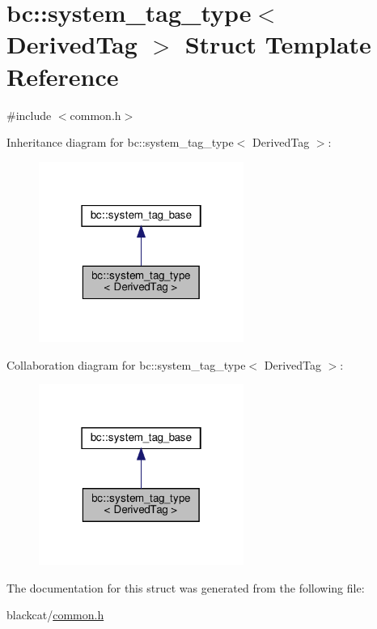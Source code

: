 \hypertarget{structbc_1_1system__tag__type}{}\section{bc\+:\+:system\+\_\+tag\+\_\+type$<$ Derived\+Tag $>$ Struct Template Reference}
\label{structbc_1_1system__tag__type}


{\ttfamily \#include $<$common.\+h$>$}



Inheritance diagram for bc\+:\+:system\+\_\+tag\+\_\+type$<$ Derived\+Tag $>$\+:\nopagebreak
\begin{figure}[H]
\begin{center}
\leavevmode
\includegraphics[width=190pt]{structbc_1_1system__tag__type__inherit__graph}
\end{center}
\end{figure}


Collaboration diagram for bc\+:\+:system\+\_\+tag\+\_\+type$<$ Derived\+Tag $>$\+:\nopagebreak
\begin{figure}[H]
\begin{center}
\leavevmode
\includegraphics[width=190pt]{structbc_1_1system__tag__type__coll__graph}
\end{center}
\end{figure}


The documentation for this struct was generated from the following file\+:\begin{DoxyCompactItemize}
\item 
blackcat/\hyperlink{common_8h}{common.\+h}\end{DoxyCompactItemize}
